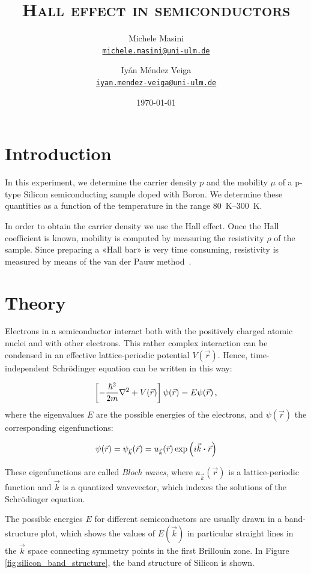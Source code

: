 \documentclass[11pt,a4paper]{article}
\title{\bfseries\textsc{Hall effect in semiconductors}}
\author{
Michele Masini\\ \small\texttt{\href{mailto:michele.masini@uni-ulm.de}{michele.masini@uni-ulm.de}}\and
Iyán Méndez Veiga\\ \small\texttt{\href{mailto:iyan.mendez-veiga@uni-ulm.de}{iyan.mendez-veiga@uni-ulm.de}}
}
\date{\today}
\begin{document}
\maketitle

\section{Introduction}
In this experiment, we determine the carrier density $p$ and the mobility $\mu$ of a p-type Silicon semiconducting sample doped with Boron. We determine these quantities as a function of the temperature in the range \SIrange{80}{300}{\kelvin}.

In order to obtain the carrier density we use the Hall effect. Once the Hall coefficient is known, mobility is computed by measuring the resistivity $\rho$ of the sample. Since preparing a «Hall bar» is very time consuming, resistivity is measured by means of the van der Pauw method~\cite{vdP}.

\section{Theory}

Electrons in a semiconductor interact both with the positively charged atomic nuclei and with other electrons. This rather complex interaction can be condensed in an effective lattice-periodic potential $V(\vec{r})$. Hence, time-independent Schrödinger equation can be written in this way:

\begin{equation}\label{eq:Schr}
\left[-\frac{\hbar^2}{2m}\laplacian + V(\vec{r})\right]\psi(\vec{r})=E\psi(\vec{r})\,,
\end{equation}
where the eigenvalues $E$ are the possible energies of the electrons, and $\psi(\vec{r})$ the corresponding eigenfunctions:

\begin{equation*}
\psi(\vec{r})=\psi_{\vec{k}}(\vec{r})=u_{\vec{k}}(\vec{r})\exp\left(i\vec{k}\vdot\vec{r}\right)
\end{equation*}

These eigenfunctions are called \emph{Bloch waves}, where $u_{\vec{k}}(\vec{r})$ is a lattice-periodic function and $\vec{k}$ is a quantized wavevector, which indexes the solutions of the Schrödinger equation.

The possible energies $E$ for different semiconductors are usually drawn in a band-structure plot, which shows the values of $E(\vec{k})$ in particular straight lines in the $\vec{k}$ space connecting symmetry points in the first Brillouin zone. In Figure \ref{fig:silicon_band_structure}, the band structure of Silicon is shown.
\end{document}
